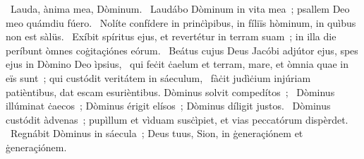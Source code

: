 ~Lauda, ànima mea, Dòminum. 
~Laudábo Dòminum in vita mea~; psallem Deo meo quámdiu fúero. 
~Nolíte confídere in prinċìpibus, in fíliïs hòminum, in quìbus non est sàlüs. 
~Exíbit spíritus ejus, et revertétur in terram suam~; in illa die períbunt òmnes coġitaçiónes eórum. 
~Beátus cujus Deus Jacóbi adjútor ejus, spes ejus in Dòmino Deo ìpsius, 
~qui feċit ċaelum et terram, mare, et òmnia quae in eïs sunt~; qui custódit veritátem in sáeculum, 
~fàċit judìċium injúriam patièntibus, dat escam esurièntibus. Dòminus solvit compedítos~; 
~Dòminus illúminat ċaecos~; Dòminus érigit elísos~; Dòminus díligit justos. 
~Dòminus custódit àdvenas~; pupìllum et vìduam susċìpiet, et vias peccatórum dispèrdet. 
~Regnábit Dòminus in sáecula~; Deus tuus, Sion, in ġeneraçiónem et ġeneraçiónem. 
